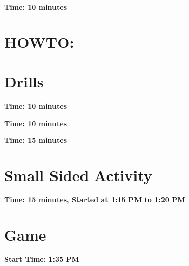 \documentclass[10pt,letterpaper]{article}
\begin{document}
%
%

\textbf{Time: 10 minutes}


\section{HOWTO:}


\section{Drills}

\textbf{Time: 10 minutes}


\textbf{Time: 10 minutes}


\textbf{Time: 15 minutes}


\section{Small Sided Activity}
\textbf{Time: 15 minutes, Started at 1:15 PM to 1:20 PM}


\section{Game}

\textbf{Start Time: 1:35 PM}
\end{document}
